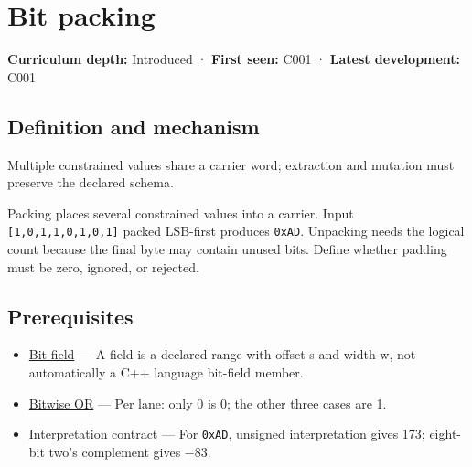 \hypertarget{appendix-1f9963e1a5d1}{}\label{referencestart:appendix-1f9963e1a5d1}
\section{Bit packing}\label{appendix-1f9963e1a5d1-bit-packing}

\hypertarget{appendix-1f9963e1a5d1-bit-packing}{}

\textbf{Curriculum depth:} Introduced · \textbf{First seen:} C001 · \textbf{Latest development:} C001

\begin{allmightroledefinition}

\subsection{Definition and mechanism}\label{appendix-1f9963e1a5d1-definition-and-mechanism}

\hypertarget{appendix-1f9963e1a5d1-definition-and-mechanism}{}

Multiple constrained values share a carrier word; extraction and mutation must preserve the declared schema.

\end{allmightroledefinition}

Packing places several constrained values into a carrier. Input \texttt{{[}1,0,1,1,0,1,0,1{]}} packed LSB-first produces \texttt{0xAD}. Unpacking needs the logical count because the final byte may contain unused bits. Define whether padding must be zero, ignored, or rejected.

\subsection{Prerequisites}\label{appendix-1f9963e1a5d1-prerequisites}

\hypertarget{appendix-1f9963e1a5d1-prerequisites}{}

\begin{itemize}
\tightlist
\item
  \hyperref[appendix-ac697f5c66e8]{Bit field} --- A field is a declared range with offset s and width w, not automatically a C++ language bit-field member.
\item
  \hyperref[appendix-a427ce8ce8a6]{Bitwise OR} --- Per lane: only 0 is 0; the other three cases are 1.
\item
  \hyperref[appendix-f414bd4ed05c]{Interpretation contract} --- For \texttt{0xAD}, unsigned interpretation gives 173; eight-bit two's complement gives −83.
\end{itemize}

